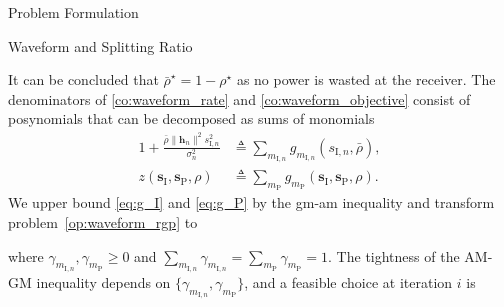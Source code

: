 \begin{section}{Problem Formulation}
\begin{subsection}{Waveform and Splitting Ratio}
\begin{mini!}
			\label{co:waveform_objective}
			\label{co:waveform_rate}
			\label{co:waveform_power}
			\label{co:waveform_splitting_ratio}
		\end{mini!}
		It can be concluded that $\bar{\rho}^{\star}=1-\rho^{\star}$ as no power is wasted at the receiver. The denominators of \eqref{co:waveform_rate} and \eqref{co:waveform_objective} consist of posynomials \cite{Boyd2007} that can be decomposed as sums of monomials
		\begin{align}
			1+\frac{\bar{\rho}\lVert{\mathbf{h}_n}\rVert^2 s_{\mathrm{I},n}^2}{\sigma_n^2} &\triangleq \sum_{m_{\mathrm{I},n}}g_{m_{\mathrm{I},n}}(s_{\mathrm{I},n},\bar{\rho})\label{eq:g_I},\\
			z(\mathbf{s}_{\mathrm{I}},\mathbf{s}_\mathrm{P},\rho) &\triangleq \sum_{m_\mathrm{P}}{g_{m_\mathrm{P}}(\mathbf{s}_{\mathrm{I}},\mathbf{s}_\mathrm{P},\rho)}\label{eq:g_P}.
		\end{align}
		We upper bound \eqref{eq:g_I} and \eqref{eq:g_P} by the \gls{gm}-\gls{am} inequality \cite{Chiang2005} and transform problem~\eqref{op:waveform_rgp} to
		\begin{mini!}
			{}{}{\label{op:waveform_gp}}{}
		\end{mini!}
		where $\gamma_{m_{\mathrm{I},n}},\gamma_{m_\mathrm{P}} \ge 0$ and $\sum_{m_{\mathrm{I},n}}\gamma_{m_{\mathrm{I},n}}=\sum_{m_\mathrm{P}}\gamma_{m_\mathrm{P}}=1$. The tightness of the AM-GM inequality depends on $\{\gamma_{m_{\mathrm{I},n}},\gamma_{m_\mathrm{P}}\}$, and a feasible choice at iteration $i$ is

\end{subsection}
\end{section}
